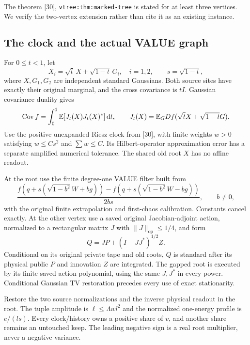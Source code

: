 \documentclass[11pt]{article}
\numberwithin{equation}{section}
\theoremstyle{remark}\newtheorem{remark}[theorem]{Remark}
\newcommand{\op}{\mathrm{op}}\newcommand{\LL}{\Lambda}
\newcommand{\norm}[1]{\lVert#1\rVert}
\newcommand{\src}[1]{\texttt{\nolinkurl{#1}}}
\newcommand{\low}[1]{\textup{[30]}, \src{#1}}
\begin{document}
The theorem \low{vtree:thm:marked-tree} is stated for at least three vertices. We verify the two-vertex extension rather than cite it as an existing instance.

\subsection{The clock and the actual VALUE graph}
For $0\le t<1$, let
\[
 X_i=\sqrt t\,X+\sqrt{1-t}\,G_i,\quad i=1,2,
 \qquad s=\sqrt{1-t},
\]
where $X,G_1,G_2$ are independent standard Gaussians. Both source sites have exactly their original marginal, and the cross covariance is $tI$. Gaussian covariance duality gives
\begin{equation}\label{eq:covclock}
 \operatorname{Cov} f=\int_0^1\mathbb E[J_t(X)J_t(X)^*]\,\mathrm d t,
 \qquad J_t(X)=\mathbb E_G Df(\sqrt t X+\sqrt{1-t}G).
\end{equation}
Use the positive unexpanded Riesz clock from [30], with finite weights $w>0$ satisfying $w\le Cs^2$ and $\sum w\le C$. Its Hilbert-operator approximation error has a separate amplified numerical tolerance. The shared old root $X$ has no affine readout.

At the root use the finite degree-one VALUE filter built from
\begin{equation}\label{eq:k2-root}
 \frac{f(q+s(\sqrt{1-b^2}W+bg))
       -f(q+s(\sqrt{1-b^2}W-bg))}{2bs},\qquad b\ne0,
\end{equation}
with the original finite extrapolation and first-chaos calibration. Constants cancel exactly. At the other vertex use a saved original Jacobian-adjoint action, normalized to a rectangular matrix $J$ with $\norm J_\op\le1/4$, and form
\begin{equation}\label{eq:stationary-child}
 Q=JP+(I-JJ^*)^{1/2}Z.
\end{equation}
Conditional on its original private tape and old roots, $Q$ is standard after its physical public $P$ and innovation $Z$ are integrated. The gapped root is executed by its finite saved-action polynomial, using the same $J,J^*$ in every power. Conditional Gaussian TV restoration precedes every use of exact stationarity.

Restore the two source normalizations and the inverse physical readout in the root. The tuple amplitude is $\ell\le\LL w l^2$ and the normalized one-energy profile is $e/(ls)$. Every clock/history owns a positive share of $v$, and another share remains an untouched keep. The leading negative sign is a real root multiplier, never a negative variance.
\end{document}
